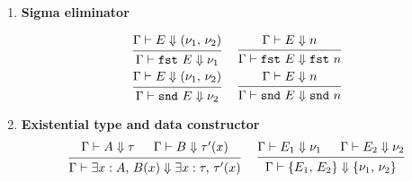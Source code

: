 \documentclass{article}
\begin{document}
\begin{enumerate}
  \item \textbf{Sigma eliminator} \\
  \begin{spreadlines}{2em}
  \begin{gather*}
    \begin{prooftree}
      \hypo{\Gamma \vdash E \Downarrow (\nu_1, \, \nu_2)}
      \infer1{\Gamma \vdash \fst \,\, E \Downarrow \nu_1}
    \end{prooftree}
   ~ \quad
   \begin{prooftree}
    \hypo{\Gamma \vdash E \Downarrow n}
     \infer1{\Gamma \vdash \fst \,\, E \Downarrow \fst \,\, n}
   \end{prooftree}
  \\
    \begin{prooftree}
      \hypo{\Gamma \vdash E \Downarrow (\nu_1, \, \nu_2)}
      \infer1{\Gamma \vdash \snd \,\, E \Downarrow \nu_2}
    \end{prooftree}
  ~ \quad
   \begin{prooftree}
     \hypo{\Gamma \vdash E \Downarrow n}
     \infer1{\Gamma \vdash \snd \,\, E \Downarrow \snd \,\, n}
   \end{prooftree}
  \end{gather*}
 \end{spreadlines}

  \item \textbf{Existential type and data constructor} \\
    \begin{gather*}
      \begin{prooftree}
        \hypo{\Gamma \vdash A \Downarrow \tau}
        \hypo{\Gamma \vdash B \Downarrow \tau'(x)}
        \infer2{\Gamma \vdash \exists x : A, \, B(x) \Downarrow \exists x : \tau, \, \tau'(x)}
      \end{prooftree}
      ~ \quad
      \begin{prooftree}
        \hypo{\Gamma \vdash E_1 \Downarrow \nu_1}
        \hypo{\Gamma \vdash E_2 \Downarrow \nu_2}
        \infer2{\Gamma \vdash \{E_1, \, E_2\} \Downarrow \{\nu_1, \, \nu_2\}}
      \end{prooftree}
    \end{gather*}
  

\end{enumerate}
\end{document}
